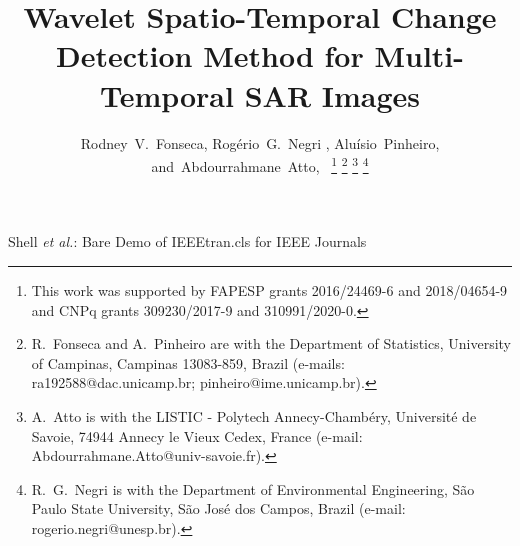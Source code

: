 \documentclass[journal]{IEEEtran}
\newcommand\orcidicon[1]{\href{https://orcid.org/#1}{\mbox{\scalerel*{
				\begin{tikzpicture}[yscale=-1,transform shape]
				\pic{orcidlogo};
				\end{tikzpicture}
			}{|}}}}
\begin{document}
%
\title{
Wavelet Spatio-Temporal Change Detection Method for Multi-Temporal SAR Images
}
%
%
%

\author{Rodney~V.~Fonseca, 
		Rog\'{e}rio~G.~Negri \orcidicon{0000-0002-4808-2362},
        Alu\'{i}sio~Pinheiro,
        and~Abdourrahmane~Atto,~%
\thanks{This work was supported by FAPESP grants 2016/24469-6 and 2018/04654-9 and CNPq grants 309230/2017-9 and 310991/2020-0.}
\thanks{R.~Fonseca and A.~Pinheiro are with the Department of Statistics, University of Campinas, Campinas 13083-859, Brazil (e-mails: ra192588@dac.unicamp.br; pinheiro@ime.unicamp.br).}
\thanks{A.~Atto is with the LISTIC - Polytech Annecy-Chamb\'{e}ry, Universit\'{e} de Savoie, 74944 Annecy le Vieux Cedex, France (e-mail: Abdourrahmane.Atto@univ-savoie.fr).}
\thanks{R.~G.~Negri is with the Department of Environmental Engineering, São Paulo State University, São José dos Campos, Brazil (e-mail: rogerio.negri@unesp.br).}
}


%
{Shell \MakeLowercase{\textit{et al.}}: Bare Demo of IEEEtran.cls for IEEE Journals}
% 




\end{document}
